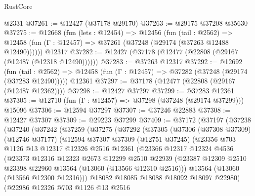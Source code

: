 \begin{lexlean}{RustCore}
\begin{coremodule}
    @2331
@37261 := @12427 (@37178 @29170)
@37263 := @29175 @37208 @35630
@37275 := @12668
    (fun (lets : @12454) =>
    @12456
      (fun (tail : @2562) =>
      @12458 (fun (Γ : @12457) => @37261 (@37248 (@29174 (@37263 @12488 @12490))))))
    @12317
@37282 := @12427 (@37178 (@12477 (@22808 (@29167 (@12487 (@12318 @12490))))))
@37283 := @37263 @12317
@37292 := @12692
    (fun (tail : @2562) => @12458 (fun (Γ : @12457) => @37282 (@37248 (@29174 (@37283 @12490)))))
    @12361
@37297 := @37178 (@12477 (@22808 (@29167 (@12487 @12362))))
@37298 := @12427 @37297
@37299 := @37283 @12361
@37305 := @12710 (fun (Γ : @12457) => @37298 (@37248 (@29174 @37299))) @15096
@37306 := @12594 @37297
@37307 := @37246 @22883
@37308 := @12427 @37307
@37309 := @29223 @37299
@37409 := @37172
    (@37197
      (@37238
        (@37240
          (@37242
            (@37259
              (@37275
                (@37292
                  (@37305
                    (@37306
                      (@37308 @37309)
                      (@12746 @37177)
                      (@12594
                        @37307
                        @37309
                        (@12751 @37245)
                        (@23356
                          @703
                          @1126
                          @13
                          @12317
                          @12326
                          @2516
                          @12361
                          (@23366
                            @12317
                            @12324
                            @4536
                            (@23373
                              @12316
                              @12323
                              @2673
                              @12299
                              @2510
                              @22939
                              (@23387
                                @12309
                                @2510
                                @23398
                                @22960
                                @13564
                                (@13060 (@13566 @12310 @2516)))
                              @13564
                              (@13060 (@13566 @12300 @12316)))
                            @18082
                            @18085
                            @18088
                            @18092
                            @18097
                            @22980)
                          (@22986
                            @12326
                            @703
                            @1126
                            @13
                            @2516

\end{coremodule}
\end{lexlean}
